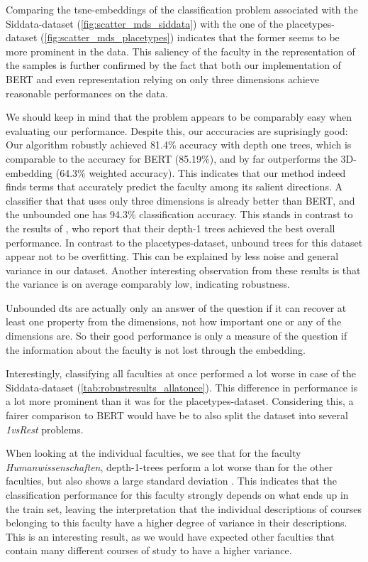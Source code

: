 Comparing the \gls{tsne}-embeddings of the classification problem associated with the Siddata-dataset (\autoref{fig:scatter_mds_siddata}) with the one of the placetypes-dataset (\autoref{fig:scatter_mds_placetypes}) indicates that the former seems to be more prominent in the data. This saliency of the faculty in the representation of the samples is further confirmed by the fact that both our implementation of BERT and even representation relying on only three dimensions achieve reasonable performances on the data.

We should keep in mind that the problem appears to be comparably easy when evaluating our performance. Despite this, our acccuracies are suprisingly good: Our algorithm robustly achieved  81.4\% accuracy with depth one trees, which is comparable to the accuracy for BERT (85.19\%), and by far outperforms the 3D-embedding (64.3\% weighted accuracy). This indicates that our method indeed finds terms that accurately predict the faculty among its salient directions. A classifier that that uses only three dimensions is already better than BERT, and the unbounded one has 94.3\% classification accuracy. This stands in contrast to the results of \cite{Ager2018}, who report that their depth-1 trees achieved the best overall performance. In contrast to the placetypes-dataset, unbound trees for this dataset appear not to be overfitting. This can be explained by less noise and general variance in our dataset. Another interesting observation from these results is that the variance is on average comparably low, indicating robustness. 

Unbounded \glspl{dt} are actually only an answer of the question if it can recover at least one property from the dimensions, not how important one or any of the dimensions are. So their good performance is only a measure of the question if the information about the faculty is not lost through the embedding.

Interestingly, classifying all faculties at once performed a lot worse in case of the Siddata-dataset (\autoref{tab:robustresults_allatonce}). This difference in performance is a lot more prominent than it was for the placetypes-dataset. %
Considering this, a fairer comparison to BERT would have be to also split the dataset into several \textit{1vsRest} problems.


When looking at the individual faculties, we see that for the faculty \textit{Humanwissenschaften}, depth-1-trees perform a lot worse than for the other faculties, but also shows a large standard deviation %
. This indicates that the classification performance for this faculty strongly depends on what ends up in the train set, leaving the interpretation that the individual descriptions of courses belonging to this faculty have a higher degree of variance in their descriptions. This is an interesting result, as we would have expected other faculties that contain many different courses of study to have a higher variance. %


